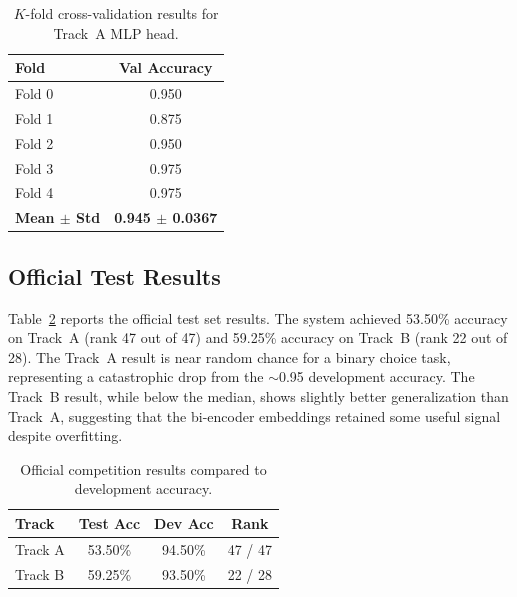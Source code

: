 \documentclass[11pt]{article}
\begin{document}
\begin{table}[ht]
  \centering
  \begin{tabular}{lc}
    \hline
    \textbf{Fold} & \textbf{Val Accuracy} \\
    \hline
    Fold 0 & 0.950  \\
    Fold 1 & 0.875  \\
    Fold 2 & 0.950  \\
    Fold 3 & 0.975  \\
    Fold 4 & 0.975  \\
    \hline
    \textbf{Mean $\pm$ Std} & \textbf{0.945 $\pm$ 0.0367} \\
    \hline
  \end{tabular}
  \caption{$K$-fold cross-validation results for Track~A MLP head.}
  \label{tab:kfold}
\end{table}



\subsection{Official Test Results}

Table~\ref{tab:official} reports the official test set results. The system achieved 53.50\% accuracy on Track~A (rank 47 out of 47) and 59.25\% accuracy on Track~B (rank 22 out of 28). The Track~A result is near random chance for a binary choice task, representing a catastrophic drop from the $\sim$0.95 development accuracy. The Track~B result, while below the median, shows slightly better generalization than Track~A, suggesting that the bi-encoder embeddings retained some useful signal despite overfitting.

\begin{table}[ht]
  \centering
  \begin{tabular}{lccc}
    \hline
    \textbf{Track} & \textbf{Test Acc} & \textbf{Dev Acc} & \textbf{Rank} \\
    \hline
    Track A & 53.50\% & 94.50\% & 47 / 47 \\
    Track B & 59.25\% & 93.50\% & 22 / 28 \\
    \hline
  \end{tabular}
  \caption{Official competition results compared to development accuracy.}
  \label{tab:official}
\end{table}
\end{document}
